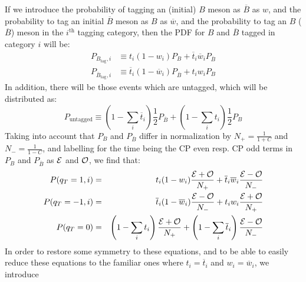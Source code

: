 \documentclass[a4paper,9pt,twoside]{article}
\begin{document}
If we introduce the probability of tagging an (initial) $B$ meson as $\overline{B}$ as $w$, and
the probability to tag an initial $\overline{B}$ meson as $B$ as $\overline{w}$, and the probability
to tag an $B$ ($\overline{B}$) meson in the $i^\mathrm{th}$ tagging category, then the
PDF for $B$ and $\overline{B}$ tagged in category $i$ will be:
\begin{eqnarray}
   P_{B_\mathrm{tag},i} &\equiv t_i (1-w_i) P_{B} + \overline{t}_i\overline{w}_i P_{\overline{ B} }\\
   P_{\overline{B}_\mathrm{tag},i} &\equiv \overline{t}_i (1-\overline{w}_i) P_{\overline{B}} + t_i w_i P_{ B }
\end{eqnarray} 
In addition, there will be those events which are untagged, which will be distributed as:
\begin{equation}
   P_{\mathrm{untagged}} \equiv \left( 1-\sum_i \overline{t}_i \right) \frac{1}{2} P_{\overline{B}} + \left( 1 - \sum_i t_i \right) \frac{1}{2} P_{ B }
\end{equation}
Taking into account that $P_{B}$ and $P_{\overline{B}}$ differ in normalization by
$N_+=\frac{1}{1+C}$ and $N_-=\frac{1}{1-C}$, and labelling for the time being the CP even 
resp. CP odd terms in $P_{B}$ and $P_{\overline{B}}$ as ${\cal E}$
and ${\cal O}$, we find that:
\begin{eqnarray}
   P(q_T=1,i) &=& t_i(1-w_i)\frac{{\cal E} + {\cal O}}{N_+} + \overline{t}_i\overline{w}_i\frac{{\cal E}-{\cal O}}{N_-}  \\
   P(q_T=-1,i) &=& \overline{t}_i(1-\overline{w}_i)\frac{{\cal E} - {\cal O}}{N_-} + t_i w_i\frac{{\cal E}+{\cal O}}{N_+} 
   \\ P(q_T=0) &=& \left(1-\sum_i t_i\right)  \frac{ { \cal E } + {\cal O} }{N_+} + \left(1-\sum_i \overline{t}_i\right)  \frac{ { \cal E} - {\cal O} } { N_- }
\end{eqnarray} 
In order to restore some symmetry to these equations, and to be able to easily reduce these
equations to the familiar ones where $t_i=\overline{t}_i$ and $w_i=\overline{w}_i$, we introduce 
\end{document}
